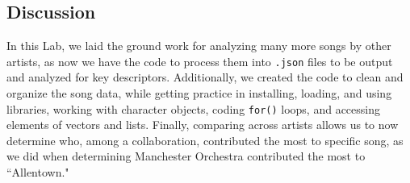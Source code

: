 \documentclass{article}\usepackage[]{graphicx}\usepackage[]{xcolor}
\begin{document}
\begin{multicols}{2}
\section{Discussion}
In this Lab, we laid the ground work for analyzing many more songs by other artists, as now we have the code to process them into \texttt{.json} files to be output and analyzed for key descriptors. Additionally, we created the code to clean and organize the song data, while getting practice in installing, loading, and using libraries, working with character objects, coding \texttt{for()} loops, and accessing elements of vectors and lists. Finally, comparing across artists allows us to now determine who, among a collaboration, contributed the most to specific song, as we did when determining Manchester Orchestra contributed the most to ``Allentown."

\vspace{2em}


\begin{tiny}

\end{tiny}
\end{multicols}
\end{document}
